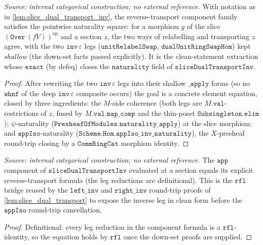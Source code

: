 \begin{lemma}\leanok
  \label{lem:slice_dual_transport_inv_naturality_apply}
  \textit{Source: internal categorical construction; no external reference.}
  With notation as in \cref{lem:slice_dual_transport_inv}, the reverse-transport component
  family satisfies the pointwise naturality square: for a morphism \(g\) of the slice
  \((\mathtt{Over}\,(fV))^{\mathrm{op}}\) and a section \(z\), the two ways of relabelling
  and transporting \(z\) agree, with the two \(\mathtt{inv}\,\varepsilon\) legs
  (\(\mathtt{unitRelabelSwap}\), \(\mathtt{dualUnitRingSwapHom}\)) kept \emph{shallow} (the
  down-set facts passed explicitly). It is the clean-statement extraction whose \(\mathtt{exact}\)
  (by defeq) closes the \(\mathtt{naturality}\) field of \(\mathtt{sliceDualTransportInv}\).
\end{lemma}
\begin{proof}
  \leanok
  After rewriting the two \(\mathtt{inv}\,\varepsilon\) legs into their shallow \(\mathtt{\_apply}\)
  forms (so no \(\mathtt{whnf}\) of the deep \(\mathtt{inv}\,\varepsilon\) composite occurs) the
  goal is a concrete element equation, closed by three ingredients: the \(M\)-side coherence
  (both legs are \(M.\mathtt{val}\)-restrictions of \(z\), fused by \(M.\mathtt{val}.\mathtt{map\_comp}\)
  and the thin-poset \(\mathtt{Subsingleton.elim}\)); \(\psi\)-naturality
  (\(\mathtt{PresheafOfModules.naturality\_apply}\)) at the slice morphism; and
  \(\mathtt{appIso}\)-naturality (\(\mathtt{Scheme.Hom.appIso\_inv\_naturality}\)), the
  \(X\)-presheaf round-trip closing by a \(\mathtt{CommRingCat}\) morphism identity.
\end{proof}

\begin{lemma}\leanok
  \label{lem:slice_dual_transport_inv_app_apply}
  \textit{Source: internal categorical construction; no external reference.}
  The \(\mathtt{app}\) component of \(\mathtt{sliceDualTransportInv}\) evaluated at a section
  equals its explicit reverse-transport formula (the leg reductions are definitional). This
  is the \(\mathtt{rfl}\) bridge reused by the \(\mathtt{left\_inv}\) and \(\mathtt{right\_inv}\)
  round-trip proofs of \cref{lem:slice_dual_transport} to expose the inverse leg in clean form
  before the \(\mathtt{appIso}\) round-trip cancellation.
\end{lemma}
\begin{proof}
  \leanok
  Definitional: every leg reduction in the component formula is a \(\mathtt{rfl}\)-identity, so
  the equation holds by \(\mathtt{rfl}\) once the down-set proofs are supplied.
\end{proof}


